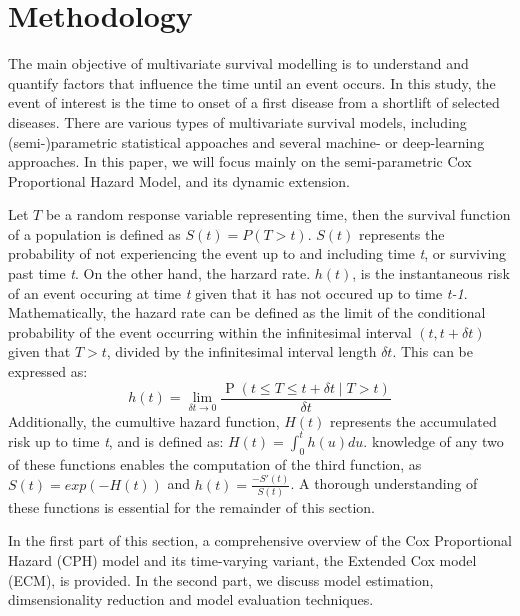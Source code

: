 \chapter{Methodology}
\label{chap:methodology}
The main objective of multivariate survival modelling is to understand and quantify factors that influence the time until an event occurs. In this study, the event of interest is the time to onset of a first disease from a shortlift of selected diseases. There are various types of multivariate survival models, including (semi-)parametric statistical appoaches and several machine- or deep-learning approaches. In this paper, we will focus mainly on the semi-parametric Cox Proportional Hazard Model, and its dynamic extension. 

Let $T$ be a random response variable representing time, then the survival function of a population is defined as \begin{math}
    S(t) = P(T>t)
\end{math}. $S(t)$ represents the probability of not experiencing the event up to and including time \textit{t}, or surviving past time \textit{t}. On the other hand, the harzard rate. $h(t)$, is the instantaneous risk of an event occuring at time \textit{t} given that it has not occured up to time \textit{t-1}. Mathematically, the hazard rate can be defined as the limit of the conditional probability of the event occurring within the infinitesimal interval $(t, t+\delta t)$ given that $T > t$, divided by the infinitesimal interval length $\delta t$. This can be expressed as:
$$
h(t)=\lim _{\delta t \rightarrow 0} \frac{\operatorname{P}(t \leq T \leq t+\delta t \mid T>t)}{\delta t}
$$
Additionally, the cumultive hazard function, $H(t)$ represents the accumulated risk up to time \textit{t}, and is defined as: $H(t) = \int_{0}^{t}h(u)du$. knowledge of any two of these functions enables the computation of the third function, as $S(t) = exp(-H(t))$ and $h(t) = \frac{-S'(t)}{S(t)}$. A thorough understanding of these functions is essential for the remainder of this section. 

In the first part of this section, a comprehensive overview of the Cox Proportional Hazard (CPH) model and its time-varying variant, the Extended Cox model (ECM), is provided. In the second part, we discuss model estimation, dimsensionality reduction and model evaluation techniques. 

